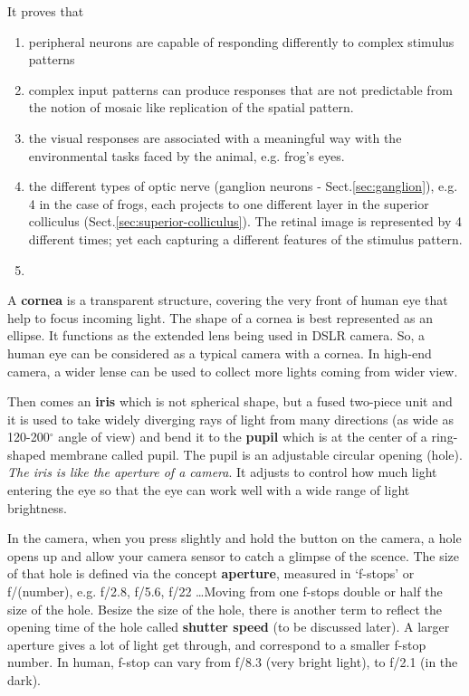 It proves that
\begin{enumerate}
  \item peripheral neurons are capable of responding differently to complex
  stimulus patterns
  
  \item complex input patterns can produce responses that are not predictable
  from the notion of mosaic like replication of the spatial pattern.
  
  \item the visual responses are associated with a meaningful way with the
  environmental tasks faced by the animal, e.g. frog's eyes.
  
  \item the different types of optic nerve (ganglion neurons -
  Sect.\ref{sec:ganglion}), e.g.
  4 in the case of frogs, each projects to one different layer in the superior colliculus
  (Sect.\ref{sec:superior-colliculus}). The retinal  image is represented by 4
  different times; yet each capturing a different features of the stimulus
  pattern.
  
  \item 
\end{enumerate}
 

 A {\bf cornea} is a transparent structure, covering the very front of human
eye that help to focus incoming light. The shape of a cornea is best represented as
an ellipse. It functions as the extended lens being used in DSLR camera. So, a
human eye can be considered as a typical camera with a cornea. In high-end
camera, a wider lense can be used to collect more lights coming from wider view.

Then comes an {\bf iris} which is not spherical shape, but a fused two-piece
unit and it is used to take widely diverging rays of light from many directions
(as wide as 120-200$^\circ$ angle of view) and bend it to the {\bf pupil} which
is at the center of a ring-shaped membrane called pupil. The pupil is an
adjustable circular opening (hole). {\it The iris is like the aperture of a
camera}.
It adjusts to control how much light entering the eye so that the eye can work
well with a wide range of light brightness.

In the camera, when you press slightly and hold the button on the camera, a hole
opens up and allow your camera sensor to catch a glimpse of the scence. The size
of that hole is defined via the concept {\bf aperture}, measured in `f-stops' or
f/(number), e.g. f/2.8, f/5.6, f/22 \ldots Moving from one f-stops double or
half the size of the hole. Besize the size of the hole, there is another term to
reflect the opening time of the hole called {\bf shutter speed} (to be discussed
later). A larger aperture gives a lot of light get through, and correspond to a
smaller f-stop number. In human, f-stop can vary from f/8.3 (very bright light),
to f/2.1 (in the dark).

